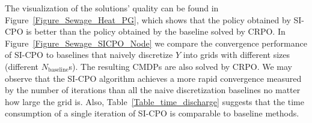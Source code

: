 The visualization of the solutions' quality can be found in Figure~\ref{Figure_Sewage_Heat_PG}, which shows that the policy obtained by SI-CPO is better than the policy obtained by the baseline solved by CRPO.
In Figure~\ref{Figure_Sewage_SICPO_Node} we compare the convergence performance of SI-CPO to baselines that naively discretize $Y$ into grids with different sizes (different $N_{\text{baseline}}$s).
The resulting CMDPs are also solved by CRPO.
We may observe that the SI-CPO algorithm achieves a more rapid convergence measured by the number of iterations than all the naive discretization baselines no matter how large the grid is.
Also, Table~\ref{Table_time_discharge} suggests that the time consumption of a single iteration of SI-CPO is comparable to baseline methods.


